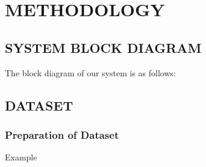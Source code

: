  \chapter{METHODOLOGY}

        \section{SYSTEM BLOCK DIAGRAM}
            The block diagram of our system is as follows:
        
       \section{DATASET}
       \subsection{Preparation of Dataset}
       Example
